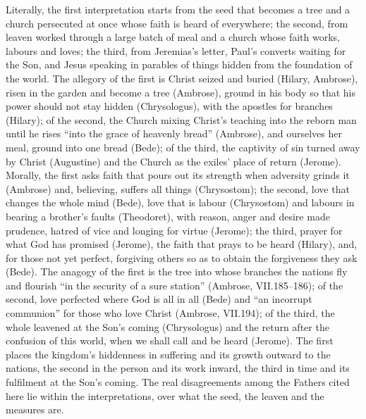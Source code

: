 Literally, the first interpretation starts from the seed that becomes a tree
and a church persecuted at once whose faith is heard of everywhere; the
second, from leaven worked through a large batch of meal and a church whose
faith works, labours and loves; the third, from Jeremias's letter, Paul's
converts waiting for the Son, and Jesus speaking in parables of things hidden
from the foundation of the world. The allegory of the first is Christ seized
and buried (Hilary, Ambrose), risen in the garden and become a tree
(Ambrose), ground in his body so that his power should not stay hidden
(Chrysologus), with the apostles for branches (Hilary); of the second, the
Church mixing Christ's teaching into
the reborn man until he rises ``into the grace of heavenly bread'' (Ambrose),
and ourselves her meal, ground into one bread (Bede); of the third, the
captivity of sin turned away by Christ (Augustine) and the Church as the
exiles' place of return (Jerome). Morally, the first asks faith that pours
out its strength when adversity grinds it (Ambrose) and, believing, suffers
all things (Chrysostom); the second, love that changes the whole mind (Bede),
love that is labour (Chrysostom) and labours in bearing a brother's faults
(Theodoret), with reason, anger and desire made prudence, hatred of vice and
longing for virtue (Jerome); the third, prayer for what God has promised
(Jerome), the faith that prays to be heard (Hilary), and, for those not yet
perfect, forgiving others so as to obtain the forgiveness they ask (Bede). The
anagogy of the first is the tree into whose branches the nations fly and
flourish ``in the security of a sure station'' (Ambrose, VII.185--186); of
the second, love perfected where
God is all in all (Bede) and ``an incorrupt communion'' for those who love
Christ (Ambrose, VII.194); of the third, the whole leavened at the Son's coming
(Chrysologus) and the return after the confusion of this world, when we shall
call and be heard (Jerome). The first places the kingdom's hiddenness in
suffering and its growth outward to the nations, the second in the person and
its work inward, the third in time and its fulfilment at the Son's coming. The
real disagreements among the Fathers cited here lie within the interpretations,
over what the seed, the leaven and the measures are.
